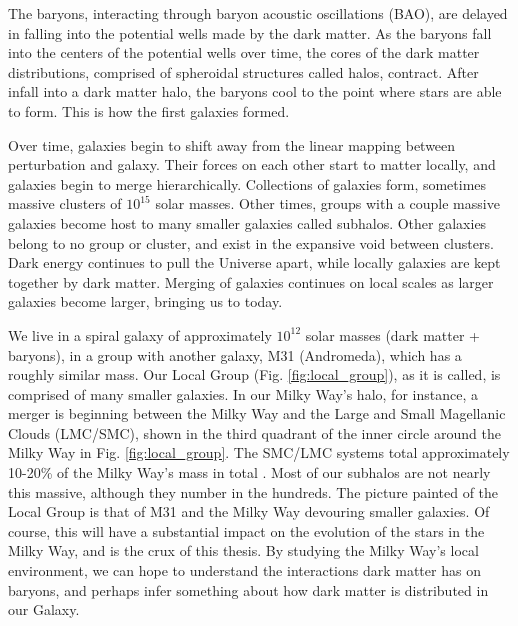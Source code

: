 The baryons, interacting through baryon acoustic oscillations (BAO), are delayed in falling into the potential wells made by the dark matter. As the baryons fall into the centers of the potential wells over time, the cores of the dark matter distributions, comprised of spheroidal structures called halos, contract. After infall into a dark matter halo, the baryons cool to the point where stars are able to form. This is how the first galaxies formed. 

Over time, galaxies begin to shift away from the linear mapping between perturbation and galaxy. Their forces on each other start to matter locally, and galaxies begin to merge hierarchically. Collections of galaxies form, sometimes massive clusters of $10^{15}$ solar masses. Other times, groups with a couple massive galaxies become host to many smaller galaxies called subhalos. Other galaxies belong to no group or cluster, and exist in the expansive void between clusters. Dark energy continues to pull the Universe apart, while locally galaxies are kept together by dark matter. Merging of galaxies continues on local scales as larger galaxies become larger, bringing us to today.

We live in a spiral galaxy of approximately $10^{12}$ solar masses (dark matter + baryons), in a group with another galaxy, M31 (Andromeda), which has a roughly similar mass. Our Local Group (Fig. \ref{fig:local_group}), as it is called, is comprised of many smaller galaxies. In our Milky Way's halo, for instance, a merger is beginning between the Milky Way and the Large and Small Magellanic Clouds (LMC/SMC), shown in the third quadrant of the inner circle around the Milky Way in Fig. \ref{fig:local_group}. The SMC/LMC systems total approximately 10-20\% of the Milky Way's mass in total \citep{erkal_lmc}. Most of our subhalos are not nearly this massive, although they number in the hundreds. The picture painted of the Local Group is that of M31 and the Milky Way devouring smaller galaxies. Of course, this will have a substantial impact on the evolution of the stars in the Milky Way, and is the crux of this thesis. By studying the Milky Way's local environment, we can hope to understand the interactions dark matter has on baryons, and perhaps infer something about how dark matter is distributed in our Galaxy.



